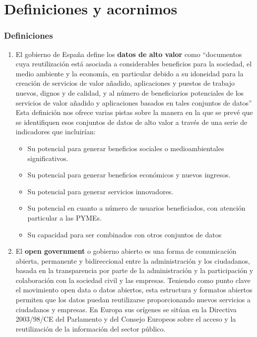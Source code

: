 \chapter{Definiciones y acornimos}
\label{Appendix:1}

\subsection{Definiciones}

\begin{enumerate}
	\item El gobierno de España define los \textbf{datos de alto valor} \label{def1}  como “documentos cuya reutilización está asociada a considerables beneficios para la sociedad, el medio ambiente y la economía, en particular debido a su idoneidad para la creación de servicios de valor añadido, aplicaciones y puestos de trabajo nuevos, dignos y de calidad, y al número de beneficiarios potenciales de los servicios de valor añadido y aplicaciones basados en tales conjuntos de datos” Esta definición nos ofrece varias pistas sobre la manera en la que se prevé que se identifiquen esos conjuntos de datos de alto valor a través de una serie de indicadores que incluirían:
		\begin{itemize}
			\item Su potencial para generar beneficios sociales o medioambientales significativos.
			
			\item Su potencial para generar beneficios económicos y nuevos ingresos.
			
			\item Su potencial para generar servicios innovadores.
			
			\item Su potencial en cuanto a número de usuarios beneficiados, con atención particular a las PYMEs.
			
			\item Su capacidad para ser combinados con otros conjuntos de datos
		\end{itemize}
		
	\item El \textbf{open government} \label{def2} o gobierno abierto es una forma de comunicación abierta, permanente y bidireccional entre la administración y los ciudadanos, basada en la transparencia por parte de la administración y la participación y colaboración con la sociedad civil y las empresas. Teniendo como punto clave el movimiento open data o datos abiertos, esta estructura y formatos abiertos permiten que los datos puedan reutilizarse proporcionando nuevos servicios a ciudadanos y empresas. En Europa sus orígenes se sitúan en la Directiva 2003/98/CE del Parlamento y del Consejo Europeos sobre el acceso y la reutilización de la información del sector público. \citep{OperGovernment2011}
	

\end{enumerate}
